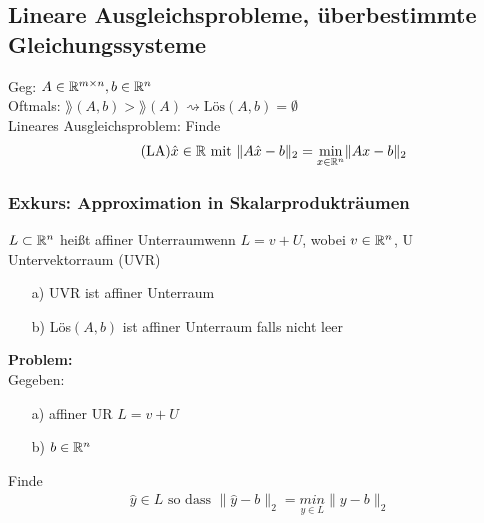 \subsection{Lineare Ausgleichsprobleme, überbestimmte Gleichungssysteme}
Geg: $A \in \mathbb R^{m\times n}, b\in \mathbb R^n$\\
Oftmals: $\rang(A,b)>\rang(A) \rightsquigarrow \text{Lös}(A,b) = \emptyset$\\

Lineares Ausgleichsproblem: Finde
\begin{align*}
\tag{LA}
\hat{x} \in \mathbb R \text{ mit } \|A\hat{x}-b\|_2 = \underset{x \in \mathbb R^n}{\mathrm{min}}\|Ax-b\|_2
\end{align*}

\subsubsection{Exkurs: Approximation in Skalarprodukträumen}
\begin{Definition}
$L \subset \mathbb R^n$ heißt \glqq affiner Unterraum\grqq wenn $L=v+U$, wobei $v \in \mathbb R^n$, U Untervektorraum (UVR)
\end{Definition}
\begin{Beispiel}\hfill
	\begin{itemize}
	\item[a)] UVR ist affiner Unterraum
	\item[b)] Lös$(A,b)$ ist affiner Unterraum falls nicht leer
	\end{itemize}
\end{Beispiel}
\textbf{Problem:}\\
Gegeben: \begin{itemize}
	 \item[a)] affiner UR $L=v+U$
	 \item[b)] $b \in \mathbb R^n$
	 \end{itemize}
Finde
\begin{align*}
\tag{MIN}
\hat{y} \in L \text{ so dass } \|\hat{y}-b\|_2 = \underset{y \in L}{min} \|y-b\|_2
\end{align*}

